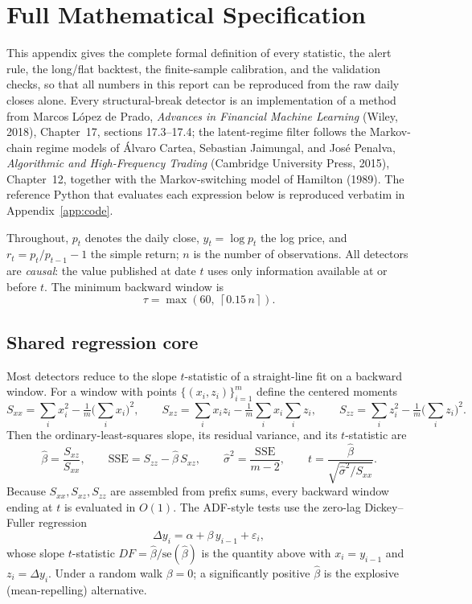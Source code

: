 \documentclass[11pt]{article}
\begin{document}
\appendix

\section{Full Mathematical Specification}\label{app:math}

This appendix gives the complete formal definition of every statistic, the alert rule, the long/flat backtest, the finite-sample calibration, and the validation checks, so that all numbers in this report can be reproduced from the raw daily closes alone. Every structural-break detector is an implementation of a method from Marcos L\'opez de Prado, \emph{Advances in Financial Machine Learning} (Wiley, 2018), Chapter~17, sections 17.3--17.4; the latent-regime filter follows the Markov-chain regime models of \'Alvaro Cartea, Sebastian Jaimungal, and Jos\'e Penalva, \emph{Algorithmic and High-Frequency Trading} (Cambridge University Press, 2015), Chapter~12, together with the Markov-switching model of Hamilton (1989). The reference Python that evaluates each expression below is reproduced verbatim in Appendix~\ref{app:code}.

Throughout, $p_t$ denotes the daily close, $y_t=\log p_t$ the log price, and $r_t = p_t/p_{t-1}-1$ the simple return; $n$ is the number of observations. All detectors are \emph{causal}: the value published at date $t$ uses only information available at or before $t$. The minimum backward window is
\[
    \tau = \max\!\left(60,\ \left\lceil 0.15\,n \right\rceil\right).
\]

\subsection{Shared regression core}

Most detectors reduce to the slope $t$-statistic of a straight-line fit on a backward window. For a window with points $\{(x_i,z_i)\}_{i=1}^{m}$ define the centered moments
\[
    S_{xx}=\sum_i x_i^2-\tfrac{1}{m}\Big(\sum_i x_i\Big)^2,\qquad
    S_{xz}=\sum_i x_i z_i-\tfrac{1}{m}\sum_i x_i\sum_i z_i,\qquad
    S_{zz}=\sum_i z_i^2-\tfrac{1}{m}\Big(\sum_i z_i\Big)^2 .
\]
Then the ordinary-least-squares slope, its residual variance, and its $t$-statistic are
\[
    \hat\beta=\frac{S_{xz}}{S_{xx}},\qquad
    \mathrm{SSE}=S_{zz}-\hat\beta\,S_{xz},\qquad
    \hat\sigma^2=\frac{\mathrm{SSE}}{m-2},\qquad
    t=\frac{\hat\beta}{\sqrt{\hat\sigma^2/S_{xx}}} .
\]
Because $S_{xx},S_{xz},S_{zz}$ are assembled from prefix sums, every backward window ending at $t$ is evaluated in $O(1)$. The ADF-style tests use the zero-lag Dickey--Fuller regression
\[
    \Delta y_i = \alpha + \beta\,y_{i-1} + \varepsilon_i ,
\]
whose slope $t$-statistic $DF=\hat\beta/\mathrm{se}(\hat\beta)$ is the quantity above with $x_i=y_{i-1}$ and $z_i=\Delta y_i$. Under a random walk $\beta=0$; a significantly positive $\hat\beta$ is the explosive (mean-repelling) alternative.
\end{document}
